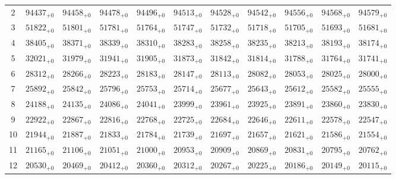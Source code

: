\documentclass[10pt, a4paper]{article}
\begin{document}
\begin{center}
\begin{tabular}{c || c c c c c | c c c c c}
        2 & \({94437}_{+0}\) & \({94458}_{+0}\) & \({94478}_{+0}\) & \({94496}_{+0}\) & \({94513}_{+0}\) & \({94528}_{+0}\) & \({94542}_{+0}\) & \({94556}_{+0}\) & \({94568}_{+0}\) & \({94579}_{+0}\)\\
        3 & \({51822}_{+0}\) & \({51801}_{+0}\) & \({51781}_{+0}\) & \({51764}_{+0}\) & \({51747}_{+0}\) & \({51732}_{+0}\) & \({51718}_{+0}\) & \({51705}_{+0}\) & \({51693}_{+0}\) & \({51681}_{+0}\)\\
        4 & \({38405}_{+0}\) & \({38371}_{+0}\) & \({38339}_{+0}\) & \({38310}_{+0}\) & \({38283}_{+0}\) & \({38258}_{+0}\) & \({38235}_{+0}\) & \({38213}_{+0}\) & \({38193}_{+0}\) & \({38174}_{+0}\)\\
        5 & \({32021}_{+0}\) & \({31979}_{+0}\) & \({31941}_{+0}\) & \({31905}_{+0}\) & \({31873}_{+0}\) & \({31842}_{+0}\) & \({31814}_{+0}\) & \({31788}_{+0}\) & \({31764}_{+0}\) & \({31741}_{+0}\)\\
        \hline
        6 & \({28312}_{+0}\) & \({28266}_{+0}\) & \({28223}_{+0}\) & \({28183}_{+0}\) & \({28147}_{+0}\) & \({28113}_{+0}\) & \({28082}_{+0}\) & \({28053}_{+0}\) & \({28025}_{+0}\) & \({28000}_{+0}\)\\
        7 & \({25892}_{+0}\) & \({25842}_{+0}\) & \({25796}_{+0}\) & \({25753}_{+0}\) & \({25714}_{+0}\) & \({25677}_{+0}\) & \({25643}_{+0}\) & \({25612}_{+0}\) & \({25582}_{+0}\) & \({25555}_{+0}\)\\
        8 & \({24188}_{+0}\) & \({24135}_{+0}\) & \({24086}_{+0}\) & \({24041}_{+0}\) & \({23999}_{+0}\) & \({23961}_{+0}\) & \({23925}_{+0}\) & \({23891}_{+0}\) & \({23860}_{+0}\) & \({23830}_{+0}\)\\
        9 & \({22922}_{+0}\) & \({22867}_{+0}\) & \({22816}_{+0}\) & \({22768}_{+0}\) & \({22725}_{+0}\) & \({22684}_{+0}\) & \({22646}_{+0}\) & \({22611}_{+0}\) & \({22578}_{+0}\) & \({22547}_{+0}\)\\
        10 & \({21944}_{+0}\) & \({21887}_{+0}\) & \({21833}_{+0}\) & \({21784}_{+0}\) & \({21739}_{+0}\) & \({21697}_{+0}\) & \({21657}_{+0}\) & \({21621}_{+0}\) & \({21586}_{+0}\) & \({21554}_{+0}\)\\
        \hline
        11 & \({21165}_{+0}\) & \({21106}_{+0}\) & \({21051}_{+0}\) & \({21000}_{+0}\) & \({20953}_{+0}\) & \({20909}_{+0}\) & \({20869}_{+0}\) & \({20831}_{+0}\) & \({20795}_{+0}\) & \({20762}_{+0}\)\\
        12 & \({20530}_{+0}\) & \({20469}_{+0}\) & \({20412}_{+0}\) & \({20360}_{+0}\) & \({20312}_{+0}\) & \({20267}_{+0}\) & \({20225}_{+0}\) & \({20186}_{+0}\) & \({20149}_{+0}\) & \({20115}_{+0}\)\\

\end{tabular}
\end{center}
\end{document}

